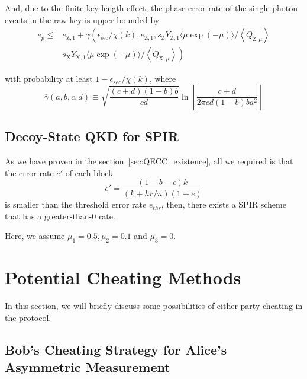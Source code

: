 \documentclass[%
 reprint,
superscriptaddress,
 amsmath,amssymb,
 aps,
]{revtex4-2}
\begin{document}
And, due to the finite key length effect, the phase error rate of the single-photon events in the raw key is upper bounded by
\begin{equation}
    \begin{aligned}
e_p \leqslant & e_{\mathrm{Z}, 1}+\bar{\gamma}\left(\epsilon_{\mathrm{sec}} / \chi(k), e_{\mathrm{Z}, 1}, s_{\mathrm{Z}} Y_{\mathrm{Z}, 1}\langle\mu \exp (-\mu)\rangle /\left\langle Q_{\mathrm{Z}, \mu}\right\rangle\right. \\
& \left.s_{\mathrm{X}} Y_{\mathrm{X}, 1}\langle\mu \exp (-\mu)\rangle /\left\langle Q_{\mathrm{X}, \mu}\right\rangle\right)
\end{aligned}
\end{equation}

with probability at least $1 - \epsilon_{sec}/χ (k)$, where
\begin{equation}
    \bar{\gamma}(a,b,c,d) \equiv \sqrt{\frac{(c+d)(1-b)b}{cd}} \ln \left[ \frac{c+d}{2\pi cd(1-b)ba^{2}} \right]
\end{equation}

\subsection{Decoy-State QKD for SPIR}

As we have proven in the section~\ref{sec:QECC_existence}, all we required is that the error rate $e'$ of each block 
\begin{equation}
    e'=\frac{(1-b-\epsilon)k}{(k+hr/n)(1+e)}
\end{equation}
is smaller than the threshold error rate $e_{thr}$, then, there exists a SPIR scheme that has a greater-than-0 rate.

Here, we assume $\mu_1 = 0.5, \mu_2 = 0.1$ and $\mu_3=0$.



\section{Potential Cheating Methods}
\label{sec:potential_cheating}

In this section, we will briefly discuss some possibilities of either party cheating in the protocol.

\subsection{Bob's Cheating Strategy for Alice's Asymmetric Measurement}
\label{sec:Bob_cheating_asymmetric_measurement}
\end{document}
